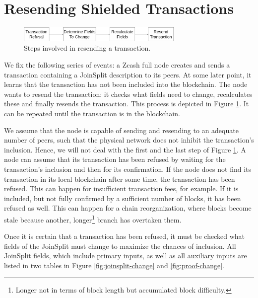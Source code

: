 \documentclass{article}
\begin{document}
\section{Resending Shielded Transactions}

\begin{figure}[t]
\includegraphics[width=8cm]{images/timeline.png}
\caption{Steps involved in resending a transaction.} \label{fig:resend-steps}
\centering
\end{figure}

We fix the following series of events: a Zcash full node creates and sends a transaction containing a JoinSplit description to its peers.
At some later point, it learns that the transaction has not been included into the blockchain.
The node wants to resend the transaction: it checks what fields need to change, recalculates these and finally resends the transaction.
This process is depicted in Figure \ref{fig:resend-steps}.
It can be repeated until the transaction is in the blockchain.

We assume that the node is capable of sending and resending to an adequate number of peers, such that the physical network does not inhibit the transaction's inclusion.
Hence, we will not deal with the first and the last step of Figure \ref{fig:resend-steps}.
A node can assume that its transaction has been refused by waiting for the transaction's inclusion and then for its confirmation.
If the node does not find its transaction in its local blockchain after some time, the transaction has been refused.
This can happen for insufficient transaction fees, for example.
If it is included, but not fully confirmed by a sufficient number of blocks, it has been refused as well.
This can happen for a chain reorganization, where blocks become stale because another, longer\footnote{Longer not in terms of block length but accumulated block difficulty.} branch has overtaken them.

Once it is certain that a transaction has been refused, it must be checked what fields of the JoinSplit must change to maximize the chances of inclusion.
All JoinSplit fields, which include primary inputs, as well as all auxiliary inputs are listed in two tables in Figure \ref{fig:joinsplit-change} and \ref{fig:proof-change}.
\end{document}
